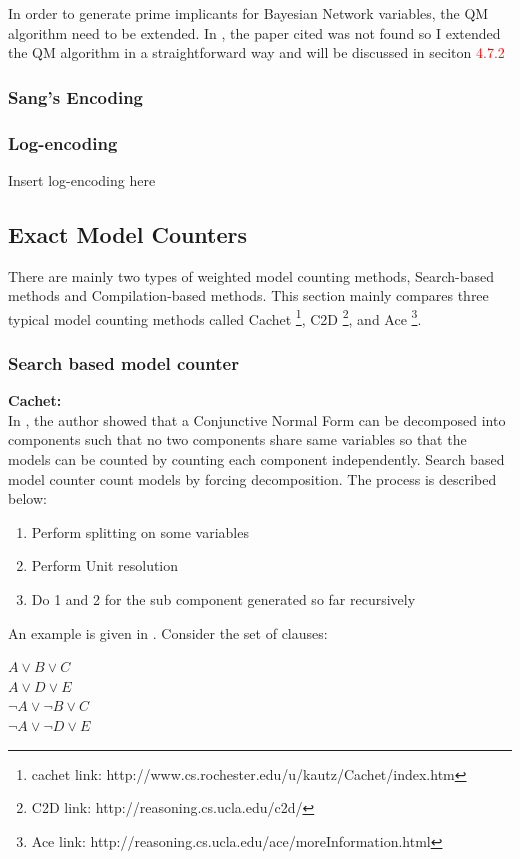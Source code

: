         In order to generate prime implicants for Bayesian Network variables, the QM algorithm need to be extended. In \cite{2006-enc3}, the paper cited was not found so I extended the QM algorithm in a straightforward way and will be discussed in seciton \textcolor{red}{4.7.2}
        
        \subsubsection{Sang's Encoding}
        \cite{Sang:2005:PBI:1619332.1619409}
        \subsubsection{Log-encoding}
        \cite{2016-logencoding}
        Insert log-encoding here


    \subsection{Exact Model Counters}
    There are mainly two types of weighted model counting methods, Search-based methods and Compilation-based methods. This section mainly compares three typical model counting methods called Cachet \footnote{cachet link: http://www.cs.rochester.edu/u/kautz/Cachet/index.htm}, C2D \footnote{C2D link: http://reasoning.cs.ucla.edu/c2d/}, and Ace \footnote{Ace link: http://reasoning.cs.ucla.edu/ace/moreInformation.html}.
    \subsubsection{Search based model counter}
    \textbf{Cachet:}\\
    In \cite{Bayardo:2000:CMU:647288.721114}, the author showed that a Conjunctive Normal Form can be decomposed into components such that no two components share same variables
    so that the models can be counted by counting each component independently.
    Search based model counter count models by forcing decomposition. The process is described below:
    \begin{enumerate}
        \item Perform splitting on some variables
        \item Perform Unit resolution
        \item Do 1 and 2 for the sub component generated so far recursively 
    \end{enumerate}
    An example is given in \cite{2008-literature-review}. Consider the set of clauses:\\
    \begin{center}
        $A \vee B \vee C$\\
        $A \vee D \vee E$\\
        $\neg A \vee \neg B \vee C$\\
        $\neg A \vee \neg D \vee E$\\
    \end{center}
    

